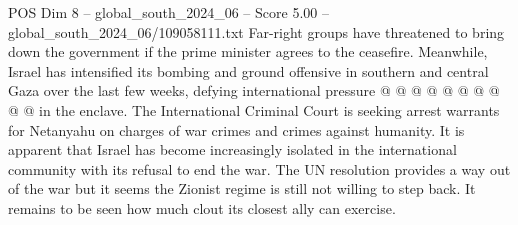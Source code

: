 \begin{textsample}{POS Dim 8 – global\_south\_2024\_06 – Score 5.00 – global\_south\_2024\_06/109058111.txt}
Far-right groups have threatened to bring down the government if the prime minister agrees to the ceasefire.
Meanwhile, Israel has intensified its bombing and ground offensive in southern and central Gaza over the last few weeks, defying international pressure @ @ @ @ @ @ @ @ @ @ in the enclave.
The International Criminal Court is seeking arrest warrants for Netanyahu on charges of war crimes and crimes against humanity.
It is apparent that Israel has become increasingly isolated in the international community with its refusal to end the war.
The UN resolution provides a way out of the war but it seems the Zionist regime is still not willing to step back.
It remains to be seen how much clout its closest ally can exercise.

\end{textsample}
